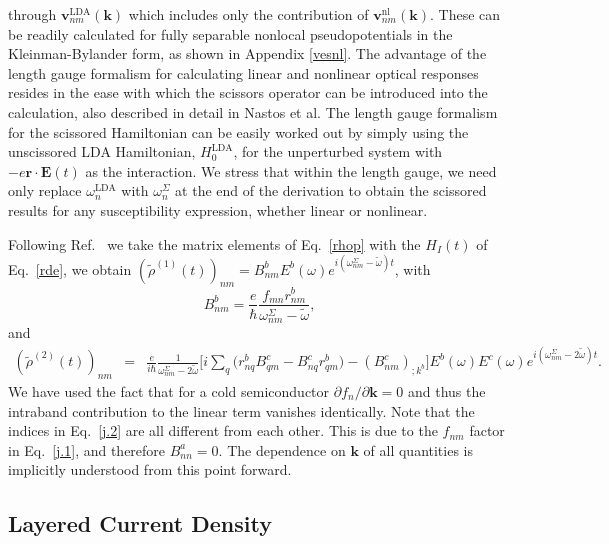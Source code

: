 \documentclass[floatfix,prb,aps,superscriptaddress,showpacs,11pt,preprint,letterpaper]{revtex4}
\begin{document}
through $\mathbf{v}^\mathrm{LDA}_{nm}(\mathbf{k})$ which 
includes only the contribution of 
$\mathbf{v}^\mathrm{nl}_{nm}(\mathbf{k})$. These can be readily
calculated
for 
fully separable nonlocal pseudopotentials in the 
Kleinman-Bylander 
form,\cite{francesco,mottaCMS10,kleinmanPRL82,adolphPRB96}
as shown in Appendix \ref{vesnl}.
The advantage of the length gauge formalism for 
calculating linear and nonlinear optical responses 
resides in the ease with which the scissors operator
can be introduced into the calculation, also described in detail in
Nastos et al.\cite{nastosPRB05} The 
length gauge formalism for the scissored Hamiltonian can be easily worked 
out by simply using the unscissored LDA Hamiltonian,
$H_0^{\mathrm{LDA}}$,
for the unperturbed system 
with $-e\mathbf{r}\cdot \mathbf{E}(t)$ as the interaction. 
We stress that within the length gauge,
we need only replace $\omega^{\mathrm{LDA}}_{n}$ with 
$\omega_{n}^{\Sigma}$ at the end of the derivation
to obtain the scissored results for any 
susceptibility expression, whether linear or nonlinear. 

Following Ref.~ we take the
matrix elements of Eq.~\eqref{rhop} with the $H_{I}(t)$ of 
Eq.~\eqref{rde}, we obtain 
$(\tilde{\rho}^{(1)}(t))_{nm}=B_{nm}^{b}E^{b}(\omega)e^{i(\omega^\Sigma_{nm}-\tilde\omega)t}$,
with 
\begin{equation}\label{j.1}
B_{nm}^{b}=\frac{e}{\hbar }\frac{f_{mn}r_{nm}^{b}}{\omega^\Sigma_{nm}-\tilde\omega},
\end{equation}
and 
\begin{eqnarray}\label{j.2}
(\tilde{\rho}^{(2)}(t))_{nm} &=&\frac{e}{i\hbar }\frac{1}{\omega^\Sigma_{nm}-2\tilde\omega}\bigg[
i\sum_{q }\Big(r_{nq }^{b}B_{q m}^{c}-B_{nq}^{c}r_{q m}^{b}
\Big)  
-(B_{nm}^{c})_{;k^{b}}\bigg]E^{b}(\omega)E^{c}(\omega)e^{i(\omega^\Sigma_{nm}-2\tilde\omega)t}
.
\end{eqnarray}
We have used the fact that for a cold semiconductor $\partial
f_{n}/\partial \mathbf{k}=0$ and thus the intraband contribution to the linear
term vanishes identically. 
Note that the indices in Eq.~\eqref{j.2} are all different from each
other. This is due to the $f_{nm}$ factor in Eq.~\eqref{j.1}, 
and therefore $B^a_{nn}=0$. The dependence on $\mathbf{k}$ 
of all quantities is implicitly understood from 
this point forward.

\subsection{Layered Current Density}\label{cd}
\end{document}
